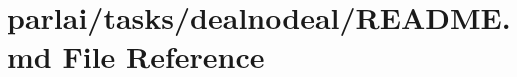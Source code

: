 \hypertarget{parlai_2tasks_2dealnodeal_2README_8md}{}\section{parlai/tasks/dealnodeal/\+R\+E\+A\+D\+ME.md File Reference}
\label{parlai_2tasks_2dealnodeal_2README_8md}
